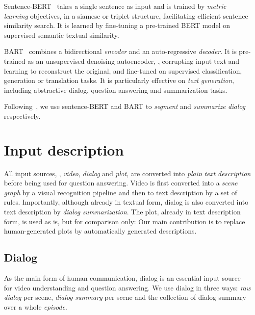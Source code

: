 \documentclass[10pt,twocolumn,letterpaper]{article}
\makeatletter
\renewcommand\paragraph{\@startsection{paragraph}{4}{\z@}{1ex}{-1em}{\normalfont\normalsize\bfseries}}
\makeatother
\begin{document}
Sentence-BERT~\cite{reimers-gurevych-2019-sentence} takes a single sentence as input and is trained by \emph{metric learning} objectives, \eg in a siamese or triplet structure, facilitating efficient sentence similarity search. It is learned by fine-tuning a pre-trained BERT model on supervised semantic textual similarity.

BART~\cite{lewis2020bart} combines a bidirectional \emph{encoder} and an auto-regressive \emph{decoder}. It is pre-trained as an unsupervised denoising autoencoder, \ie, corrupting input text and learning to reconstruct the original, and fine-tuned on supervised classification, generation or translation tasks. It is particularly effective on \emph{text generation}, including abstractive dialog, question answering and summarization tasks.

Following~\cite{chen2020multi}, we use sentence-BERT and BART to \emph{segment} and \emph{summarize dialog} respectively. \section{Input description}
\label{sec:input}

All input sources, \ie, \emph{video}, \emph{dialog} and \emph{plot}, are converted into \emph{plain text description} before being used for question answering. Video is first converted into a \emph{scene graph} by a visual recognition pipeline and then to text description by a set of rules. Importantly, although already in textual form, dialog is also converted into text description by \emph{dialog summarization}. The plot, already in text description form, is used as is, but for comparison only: Our main contribution is to replace human-generated plots by automatically generated descriptions.



\subsection{Dialog}
\label{sec:dialog}

As the main form of human communication, dialog is an essential input source for video understanding and question answering. We use dialog in three ways: \emph{raw dialog} per scene, \emph{dialog summary} per scene and the collection of dialog summary over a whole \emph{episode}.



\paragraph{Raw scene dialog}
\end{document}
